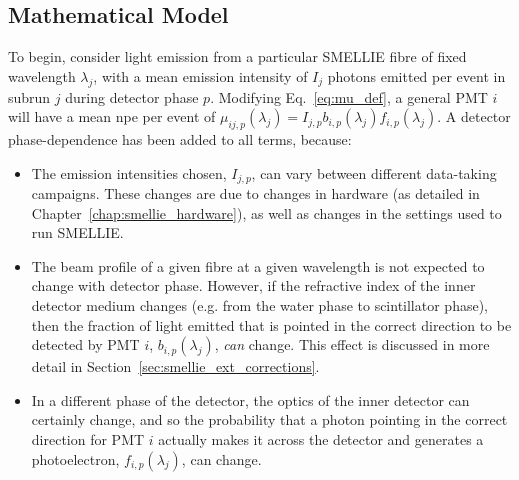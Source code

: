 \begin{figure}
    \centering
    \caption[]{}
    \label{fig:smellie_expected_ext_length_phases}
\end{figure}

\subsection{Mathematical Model}
To begin, consider light emission from a particular SMELLIE fibre of fixed wavelength $\lambda_{j}$, with a mean emission intensity of $I_{j}$ photons emitted per event in subrun $j$ during detector phase $p$. Modifying Eq.~\ref{eq:mu_def}, a general PMT $i$ will have a mean npe per event of $\mu_{ij,p}(\lambda_{j}) = I_{j,p}b_{i,p}(\lambda_{j})f_{i,p}(\lambda_{j})$. A detector phase-dependence has been added to all terms, because:
\begin{itemize}
    \item The emission intensities chosen, $I_{j,p}$, can vary between different data-taking campaigns. These changes are due to changes in hardware (as detailed in Chapter~\ref{chap:smellie_hardware}), as well as changes in the settings used to run SMELLIE.
    \item The beam profile of a given fibre at a given wavelength is not expected to change with detector phase. However, if the refractive index of the inner detector medium changes (e.g. from the water phase to scintillator phase), then the fraction of light emitted that is pointed in the correct direction to be detected by PMT $i$, $b_{i,p}(\lambda_{j})$, \textit{can} change. This effect is discussed in more detail in Section~\ref{sec:smellie_ext_corrections}.
    \item In a different phase of the detector, the optics of the inner detector can certainly change, and so the probability that a photon pointing in the correct direction for PMT $i$ actually makes it across the detector and generates a photoelectron, $f_{i,p}(\lambda_{j})$, can change.
\end{itemize}

